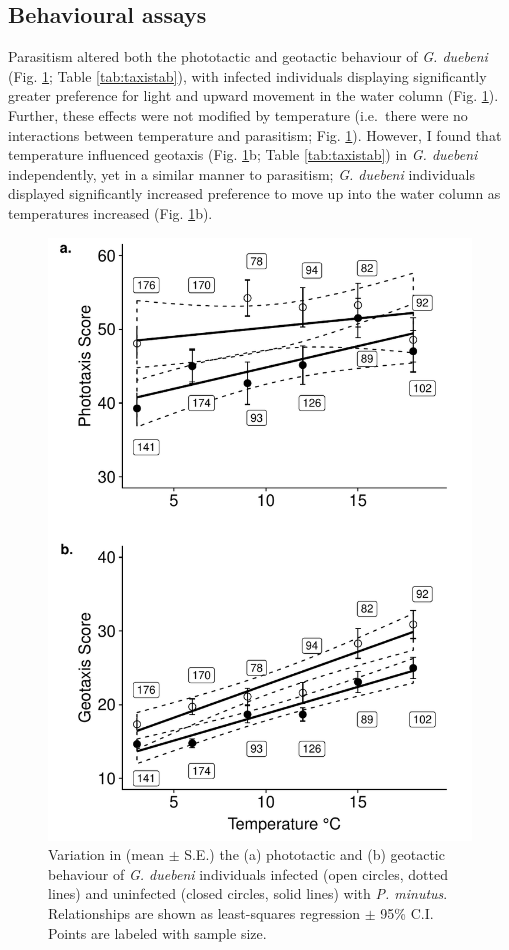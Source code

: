\subsection{Behavioural assays}
Parasitism altered both the phototactic and geotactic behaviour of \emph{G. duebeni} (Fig. \ref{fig:taxis}; Table \ref{tab:taxistab}), with infected individuals displaying significantly greater preference for light and upward movement in the water column (Fig. \ref{fig:taxis}). Further, these effects were not modified by temperature (i.e.\ there were no interactions between temperature and parasitism; Fig. \ref{fig:taxis}). However, I found that temperature influenced geotaxis (Fig. \ref{fig:taxis}b; Table \ref{tab:taxistab}) in \emph{G. duebeni} independently, yet in a similar manner to parasitism; \emph{G. duebeni} individuals displayed significantly increased preference to move up into the water column as temperatures increased (Fig. \ref{fig:taxis}b). 

\begin{figure}[H]
    \centering
    \includegraphics[keepaspectratio,width=\textwidth]{figures/ch2/taxis_1.pdf}
  \caption [Impact of temperature and parasitic infection on predator-avoidance behaviour]{Variation in (mean $\pm$ S.E.) the (a) phototactic and (b) geotactic behaviour of \emph{G. duebeni} individuals infected (open circles, dotted lines) and uninfected (closed circles, solid lines) with \emph{P. minutus}. Relationships are shown as least-squares regression $\pm$ 95\% C.I. Points are labeled with sample size.} 
    \label{fig:taxis}
\end{figure}

